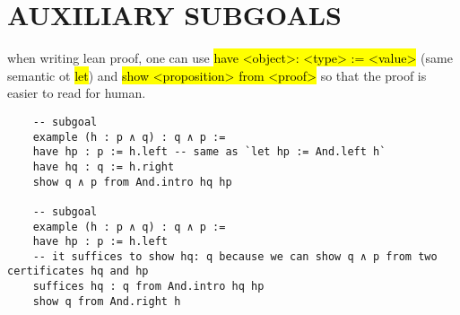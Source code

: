 \section{AUXILIARY SUBGOALS}


when writing lean proof, one can use \hl{have <object>: <type> := <value>} (same semantic ot \hl{let}) and \hl{show <proposition> from <proof>} so that the proof is easier to read for human.

\begin{lstlisting}
	-- subgoal
	example (h : p ∧ q) : q ∧ p :=
	have hp : p := h.left -- same as `let hp := And.left h`
	have hq : q := h.right
	show q ∧ p from And.intro hq hp
	
	-- subgoal
	example (h : p ∧ q) : q ∧ p :=
	have hp : p := h.left
	-- it suffices to show hq: q because we can show q ∧ p from two certificates hq and hp
	suffices hq : q from And.intro hq hp
	show q from And.right h
\end{lstlisting}


